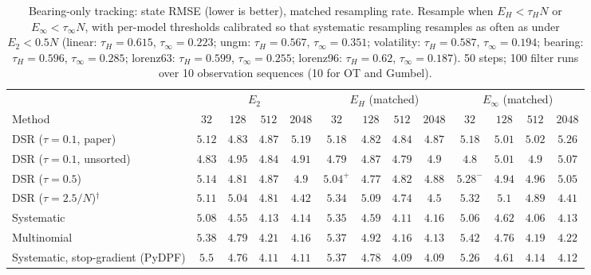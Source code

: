 \begin{table}[ht]
\centering
\small
\caption{Bearing-only tracking: state RMSE (lower is better), matched resampling rate. Resample when $E_H<\tau_HN$ or $E_\infty<\tau_\infty N$, with per-model thresholds calibrated so that systematic resampling resamples as often as under $E_2<0.5N$ (linear: $\tau_H{=}0.615$, $\tau_\infty{=}0.223$; ungm: $\tau_H{=}0.567$, $\tau_\infty{=}0.351$; volatility: $\tau_H{=}0.587$, $\tau_\infty{=}0.194$; bearing: $\tau_H{=}0.596$, $\tau_\infty{=}0.285$; lorenz63: $\tau_H{=}0.599$, $\tau_\infty{=}0.255$; lorenz96: $\tau_H{=}0.62$, $\tau_\infty{=}0.187$). 50 steps; 100 filter runs over 10 observation sequences (10 for OT and Gumbel).}
\label{tab:trigger-matched-bearing-rmse}
\begin{adjustbox}{max width=\linewidth}
\begin{tabular}{lcccc|cccc|cccc}
\toprule
 & \multicolumn{4}{c}{$E_2$} & \multicolumn{4}{c}{$E_H$ (matched)} & \multicolumn{4}{c}{$E_\infty$ (matched)} \\
\cmidrule(lr){2-5} \cmidrule(lr){6-9} \cmidrule(lr){10-13}
Method & $32$ & $128$ & $512$ & $2048$ & $32$ & $128$ & $512$ & $2048$ & $32$ & $128$ & $512$ & $2048$ \\
\midrule
DSR ($\tau{=}0.1$, paper) & $\mathbf{5.12}$ & $4.83$ & $4.87$ & $5.19$ & $5.18$ & $\mathbf{4.82}$ & $\mathbf{4.84}$ & $\mathbf{4.87}$ & $5.18$ & $5.01$ & $5.02$ & $5.26$ \\
DSR ($\tau{=}0.1$, unsorted) & $4.83$ & $4.95$ & $4.84$ & $4.91$ & $\mathbf{4.79}$ & $\mathbf{4.87}$ & $\mathbf{4.79}$ & $\mathbf{4.9}$ & $4.8$ & $5.01$ & $4.9$ & $5.07$ \\
DSR ($\tau{=}0.5$) & $5.14$ & $4.81$ & $4.87$ & $4.9$ & $\mathbf{5.04}^{+}$ & $\mathbf{4.77}$ & $\mathbf{4.82}$ & $\mathbf{4.88}$ & $5.28^{-}$ & $4.94$ & $4.96$ & $5.05$ \\
DSR ($\tau{=}2.5/N$)$^\dagger$ & $\mathbf{5.11}$ & $\mathbf{5.04}$ & $4.81$ & $4.42$ & $5.34$ & $5.09$ & $\mathbf{4.74}$ & $4.5$ & $5.32$ & $5.1$ & $4.89$ & $\mathbf{4.41}$ \\
\midrule
Systematic & $5.08$ & $\mathbf{4.55}$ & $4.13$ & $4.14$ & $5.35$ & $4.59$ & $4.11$ & $4.16$ & $\mathbf{5.06}$ & $4.62$ & $\mathbf{4.06}$ & $\mathbf{4.13}$ \\
Multinomial & $5.38$ & $4.79$ & $4.21$ & $4.16$ & $\mathbf{5.37}$ & $4.92$ & $\mathbf{4.16}$ & $\mathbf{4.13}$ & $5.42$ & $\mathbf{4.76}$ & $4.19$ & $4.22$ \\
Systematic, stop-gradient (PyDPF) & $5.5$ & $4.76$ & $4.11$ & $4.11$ & $5.37$ & $4.78$ & $\mathbf{4.09}$ & $\mathbf{4.09}$ & $\mathbf{5.26}$ & $\mathbf{4.61}$ & $4.14$ & $4.12$ \\

\end{tabular}
\end{adjustbox}
\end{table}
